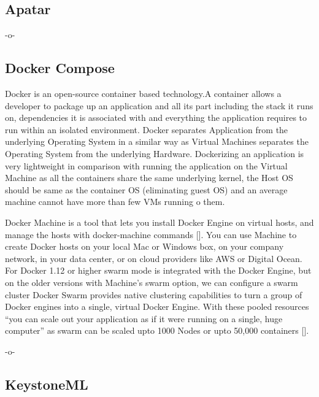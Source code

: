 \subsection{Apatar}

-o-

\subsection{Docker Compose}

Docker is an open-source container based technology.A container allows
a developer to package up an application and all its part including
the stack it runs on, dependencies it is associated with and
everything the application requires to run within an isolated
environment. Docker separates Application from the underlying
Operating System in a similar way as Virtual Machines separates the
Operating System from the underlying Hardware. Dockerizing an
application is very lightweight in comparison with running the
application on the Virtual Machine as all the containers share the
same underlying kernel, the Host OS should be same as the container OS
(eliminating guest OS) and an average machine cannot have more than
few VMs running o them.

Docker Machine is a tool that lets you install Docker Engine on
virtual hosts, and manage the hosts with docker-machine commands
[\cite{docker-book}]. You can use Machine to create Docker hosts on
your local Mac or Windows box, on your company network, in your data
center, or on cloud providers like AWS or Digital Ocean. For Docker
1.12 or higher swarm mode is integrated with the Docker Engine, but on
the older versions with Machine's swarm option, we can configure a
swarm cluster Docker Swarm provides native clustering capabilities to
turn a group of Docker engines into a single, virtual Docker
Engine. With these pooled resources ``you can scale out your
application as if it were running on a single, huge computer'' as
swarm can be scaled upto 1000 Nodes or upto 50,000 containers
[\cite{www-docker}].

    -o-
    
\subsection{KeystoneML}
    
